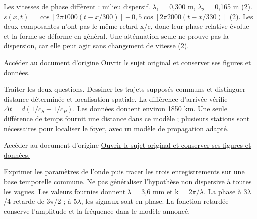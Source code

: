 Les vitesses de phase diffèrent : milieu dispersif. \ensuremath{\lambda_1} = 0,300 m, \ensuremath{\lambda_2} = 0,165 m (2). $s(x,t)=\cos[2\pi1000(t-x/300)]+0{,}5\cos[2\pi2000(t-x/330)]$ (2). Les deux composantes n’ont pas le même retard x/c, donc leur phase relative évolue et la forme se déforme en général. Une atténuation seule ne prouve pas la dispersion, car elle peut agir sans changement de vitesse (2).


\begin{loi}{Accéder au document d’origine}
\href{https://mpsi.schleck.ovh/fichiers/td/td9_ondes.pdf}{Ouvrir le sujet original et conserver ses figures et données.}
\end{loi}
Traiter les deux questions. Dessiner les trajets supposés communs et distinguer distance déterminée et localisation spatiale.
La différence d’arrivée vérifie $\Delta t=d(1/c_S-1/c_P)$. Les données donnent environ 1850 km. Une seule différence de temps fournit une distance dans ce modèle ; plusieurs stations sont nécessaires pour localiser le foyer, avec un modèle de propagation adapté.

\begin{loi}{Accéder au document d’origine}
\href{https://mpsi.schleck.ovh/fichiers/devoirs/2025-2026/ds5_molecules_ondes_cinematique.pdf}{Ouvrir le sujet original et conserver ses figures et données.}
\end{loi}
Exprimer les paramètres de l’onde puis tracer les trois enregistrements sur une base temporelle commune. Ne pas généraliser l’hypothèse non dispersive à toutes les vagues.
Les valeurs fournies donnent \ensuremath{\lambda} = 3,6 mm et k = 2\ensuremath{\pi}/\ensuremath{\lambda}. La phase à 3\ensuremath{\lambda}/4 retarde de 3\ensuremath{\pi}/2 ; à 5\ensuremath{\lambda}, les signaux sont en phase. La fonction retardée conserve l’amplitude et la fréquence dans le modèle annoncé.

